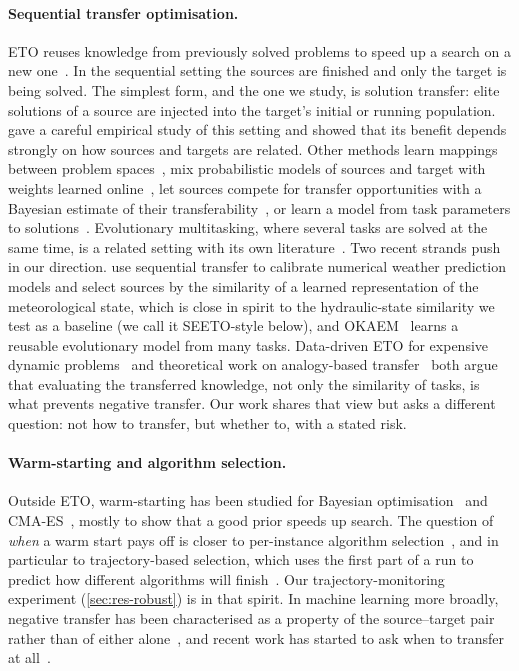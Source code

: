 \documentclass[11pt]{article}
\begin{document}
\paragraph{Sequential transfer optimisation.}
ETO reuses knowledge from previously solved problems to speed up a search on a new one~\citep{gupta2018insights,tan2021eto}.
In the sequential setting the sources are finished and only the target is being solved. The simplest form, and the
one we study, is solution transfer: elite solutions of a source are injected into the target's initial or running
population. \citet{xue2024solution} gave a careful empirical study of this setting and showed that its benefit depends
strongly on how sources and targets are related. Other methods learn mappings between problem
spaces~\citep{feng2017autoencoding}, mix probabilistic models of sources and target with weights learned
online~\citep{da2019curbing}, let sources compete for transfer opportunities with a Bayesian estimate of their
transferability~\citep{xue2024competitive,lu2025bckt}, or learn a model from task parameters to
solutions~\citep{wei2025pmto}. Evolutionary multitasking, where several tasks are solved at the same time, is a
related setting with its own literature~\citep{gupta2016multifactorial,osaba2022emto}. Two recent strands push in our
direction. \citet{fang2026seeto} use sequential transfer to calibrate numerical weather prediction models and select
sources by the similarity of a learned representation of the meteorological state, which is close in spirit to the
hydraulic-state similarity we test as a baseline (we call it SEETO-style below), and OKAEM~\citep{wang2025okaem}
learns a reusable evolutionary model from many tasks. Data-driven ETO for expensive dynamic problems~\citep{li2024datadriven}
and theoretical work on analogy-based transfer~\citep{xue2025analogy} both argue that evaluating the transferred
knowledge, not only the similarity of tasks, is what prevents negative transfer. Our work shares that view but asks
a different question: not how to transfer, but whether to, with a stated risk.

\paragraph{Warm-starting and algorithm selection.}
Outside ETO, warm-starting has been studied for Bayesian optimisation~\citep{feurer2015initializing,poloczek2016warm}
and CMA-ES~\citep{nomura2021warm}, mostly to show that a good prior speeds up search. The question of \emph{when} a
warm start pays off is closer to per-instance algorithm selection~\citep{kerschke2019aas}, and in particular to
trajectory-based selection, which uses the first part of a run to predict how different algorithms will
finish~\citep{jankovic2022trajectory,renau2024probing}. Our trajectory-monitoring experiment (\cref{sec:res-robust}) is in that
spirit. In machine learning more broadly, negative transfer has been characterised as a property of the
source--target pair rather than of either alone~\citep{rosenstein2005transfer,wang2019negative,pan2010survey},
and recent work has started to ask when to transfer at all~\citep{cherkaoui2025when}.
\end{document}
